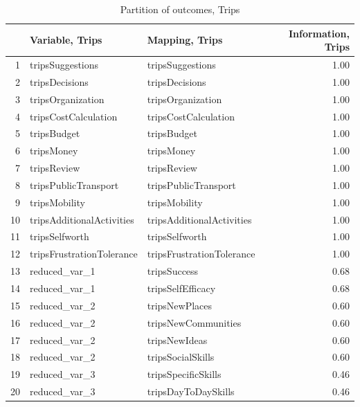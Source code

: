 \documentclass[12pt, a4paper]{article}\usepackage[]{graphicx}\usepackage[]{color}
\makeatletter
\newenvironment{kframe}{%
 \def\at@end@of@kframe{}%
 \ifinner\ifhmode%
  \def\at@end@of@kframe{\end{minipage}}%
  \begin{minipage}{\columnwidth}%
 \fi\fi%
 \def\FrameCommand##1{\hskip\@totalleftmargin \hskip-\fboxsep
 \colorbox{shadecolor}{##1}\hskip-\fboxsep
     \hskip-\linewidth \hskip-\@totalleftmargin \hskip\columnwidth}%
 \MakeFramed {\advance\hsize-\width
   \@totalleftmargin\z@ \linewidth\hsize
   \@setminipage}}%
 {\par\unskip\endMakeFramed%
 \at@end@of@kframe}
\makeatother
\begin{document}
\begin{table}[ht]
\centering
\begin{tabular}{rllr}
  \hline
 & Variable, Trips & Mapping, Trips & Information, Trips \\ 
  \hline
1 & tripsSuggestions & tripsSuggestions & 1.00 \\ 
  2 & tripsDecisions & tripsDecisions & 1.00 \\ 
  3 & tripsOrganization & tripsOrganization & 1.00 \\ 
  4 & tripsCostCalculation & tripsCostCalculation & 1.00 \\ 
  5 & tripsBudget & tripsBudget & 1.00 \\ 
  6 & tripsMoney & tripsMoney & 1.00 \\ 
  7 & tripsReview & tripsReview & 1.00 \\ 
  8 & tripsPublicTransport & tripsPublicTransport & 1.00 \\ 
  9 & tripsMobility & tripsMobility & 1.00 \\ 
  10 & tripsAdditionalActivities & tripsAdditionalActivities & 1.00 \\ 
  11 & tripsSelfworth & tripsSelfworth & 1.00 \\ 
  12 & tripsFrustrationTolerance & tripsFrustrationTolerance & 1.00 \\ 
  13 & reduced\_var\_1 & tripsSuccess & 0.68 \\ 
  14 & reduced\_var\_1 & tripsSelfEfficacy & 0.68 \\ 
  15 & reduced\_var\_2 & tripsNewPlaces & 0.60 \\ 
  16 & reduced\_var\_2 & tripsNewCommunities & 0.60 \\ 
  17 & reduced\_var\_2 & tripsNewIdeas & 0.60 \\ 
  18 & reduced\_var\_2 & tripsSocialSkills & 0.60 \\ 
  19 & reduced\_var\_3 & tripsSpecificSkills & 0.46 \\ 
  20 & reduced\_var\_3 & tripsDayToDaySkills & 0.46 \\ 
   \hline
\end{tabular}
\caption{Partition of outcomes, Trips} 
\end{table}
\begin{kframe}

{\ttfamily\noindent\bfseries\color{errorcolor}{\#\# Error in print.default(m, ..., quote = quote, right = right, max = max): ungültiges 'digits' Argument}}\end{kframe}

\printbibliography
\end{document}
